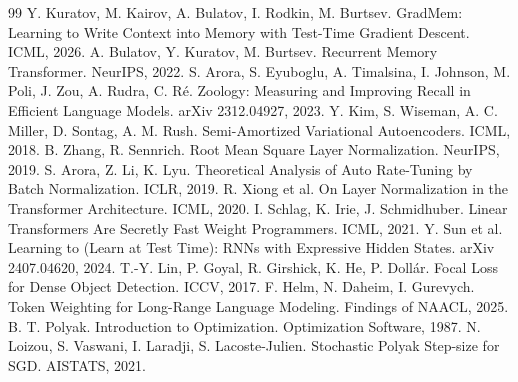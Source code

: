 \documentclass[a4paper,11pt]{article}
\begin{document}
\begin{thebibliography}{99}\small
{} Y. Kuratov, M. Kairov, A. Bulatov, I. Rodkin, M. Burtsev. GradMem: Learning to Write Context into Memory with Test-Time Gradient Descent. ICML, 2026.
 A. Bulatov, Y. Kuratov, M. Burtsev. Recurrent Memory Transformer. NeurIPS, 2022.
 S. Arora, S. Eyuboglu, A. Timalsina, I. Johnson, M. Poli, J. Zou, A. Rudra, C. Ré. Zoology: Measuring and Improving Recall in Efficient Language Models. arXiv 2312.04927, 2023.
 Y. Kim, S. Wiseman, A. C. Miller, D. Sontag, A. M. Rush. Semi-Amortized Variational Autoencoders. ICML, 2018.
 B. Zhang, R. Sennrich. Root Mean Square Layer Normalization. NeurIPS, 2019.
 S. Arora, Z. Li, K. Lyu. Theoretical Analysis of Auto Rate-Tuning by Batch Normalization. ICLR, 2019.
 R. Xiong et al. On Layer Normalization in the Transformer Architecture. ICML, 2020.
 I. Schlag, K. Irie, J. Schmidhuber. Linear Transformers Are Secretly Fast Weight Programmers. ICML, 2021.
 Y. Sun et al. Learning to (Learn at Test Time): RNNs with Expressive Hidden States. arXiv 2407.04620, 2024.
 T.-Y. Lin, P. Goyal, R. Girshick, K. He, P. Dollár. Focal Loss for Dense Object Detection. ICCV, 2017.
 F. Helm, N. Daheim, I. Gurevych. Token Weighting for Long-Range Language Modeling. Findings of NAACL, 2025.
 B. T. Polyak. Introduction to Optimization. Optimization Software, 1987.
 N. Loizou, S. Vaswani, I. Laradji, S. Lacoste-Julien. Stochastic Polyak Step-size for SGD. AISTATS, 2021.
\end{thebibliography}
\end{document}
